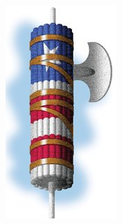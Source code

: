 \begin{frame}
    \centering
    \includegraphics[width=.9\textwidth]{img/fasces/flag-fasces.jpg} \\
\end{frame}
